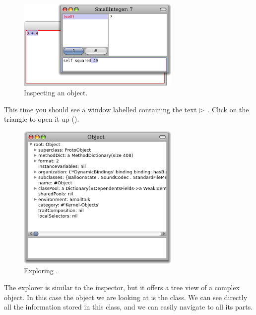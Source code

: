 \documentclass[a4paper,10pt,twoside]{book}
\begin{document}
\begin{figure}[htb]
\centerline {\includegraphics[width=0.7\textwidth]{InspectIt}}
\caption{Inspecting an object. \label{fig:inspectit}}
\end{figure}



This time you should see a window labelled  containing the text
\mbox{$\triangleright$ }.
Click on the triangle to open it up ().

\begin{figure}[htb]
\centerline {\includegraphics[width=0.7\textwidth]{ExploreIt}}
\caption{Exploring . \label{fig:exploreit}}
\end{figure}

The explorer is similar to the inspector, but it offers a tree view of a complex object.
In this case the object we are looking at is the  class.
We can see directly all the information stored in this class, and we can easily navigate to all its parts.
\end{document}
